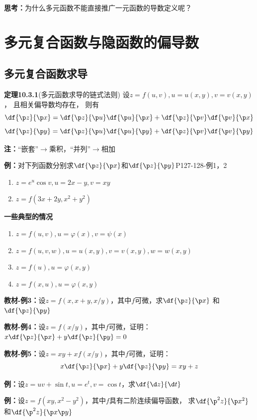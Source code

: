 {\bf 思考：}为什么多元函数不能直接推广一元函数的导数定义呢？

\section{多元复合函数与隐函数的偏导数}

\subsection{多元复合函数求导}

{\bf 定理10.3.1}(多元函数求导的链式法则)
设$z=f(u,v),u=u(x,y),v=v(x,y)$， 且相关偏导数均存在， 则有
$${\df{\p z}{\p x}=\df{\p z}{\p u}\df{\p u}{\p x}
+\df{\p z}{\p v}\df{\p v}{\p x}}$$
$${\df{\p z}{\p y}=\df{\p z}{\p u}\df{\p u}{\p y}
+\df{\p z}{\p v}\df{\p v}{\p y}}$$

{\bf 注：}“嵌套”$\to$乘积，“并列”$\to$相加

{\bf 例：}对下列函数分别求$\df{\p z}{\p x}$和$\df{\p z}{\p y}$\hfill P127-128-例1，2
\begin{enumerate}[(1)]
  \setlength{\itemindent}{1cm}
  \item $z=e^u\cos v,u=2x-y,v=xy$
  \item $z=f(3x+2y,x^2+y^2)$
\end{enumerate}

\begin{shaded}
	{\bf 一些典型的情况}
	
	\begin{enumerate}[(1)]
  	  \setlength{\itemindent}{1cm}
	  \item $z=f(u,v),u=\varphi(x),v=\psi(x)$ 
	  \item $z=f(u,v,w),u=u(x,y),v=v(x,y),w=w(x,y)$ 
	  \item $z=f(u),u=\varphi(x,y)$ 
	  \item $z=f(x,u),u=\varphi(x,y)$
	\end{enumerate}
\end{shaded}

{\bf 教材-例3：}设$z=f(x,x+y,x/y)$，其中$f$可微，求$\df{\p z}{\p x}$
和$\df{\p z}{\p y}$

{\bf 教材-例4：}设$z=f(x/y)$，其中$f$可微，证明：$x\df{\p z}{\p x}+y
\df{\p z}{\p y}=0$

{\bf 教材-例5：}设$z=xy+xf(x/y)$，其中$f$可微，证明：
$$x\df{\p z}{\p x}+y\df{\p z}{\p y}=xy+z$$

{\bf 例：}设$z=uv+\sin t,u=e^t,v=\cos t$，求$\df{\d z}{\d t}$

{\bf 例：}设$z=f(xy,x^2-y^2)$，其中$f$具有二阶连续偏导函数，
求$\df{\p^2 z}{\p x^2}$和$\df{\p^2 z}{\p x\p y}$

